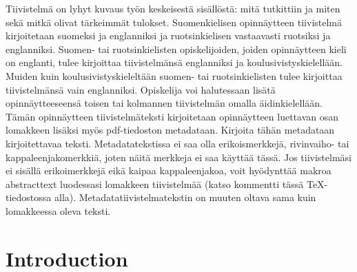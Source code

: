 \documentclass[english, 12pt, a4paper, sci, utf8, a-2b, online]{aaltothesis}
\theoremstyle{definition}
\theoremstyle{plain}
\numberwithin{equation}{section}
\begin{document}
\newpage
\date{9.2.2023}
\begin{abstractpage}[finnish]
Tiivistelmä on lyhyt kuvaus työn keskeisestä sisällöstä: mitä tutkittiin ja 
miten sekä mitkä olivat tärkeimmät tulokset. Suomenkielisen opinnäytteen 
tiivistelmä kirjoitetaan suomeksi ja englanniksi ja ruotsinkielisen vastaavasti 
ruotsiksi ja englanniksi. Suomen- tai ruotsinkielisten opiskelijoiden, joiden 
opinnäytteen kieli on englanti, tulee kirjoittaa tiivistelmänsä englanniksi ja 
koulusivistyskielellään. Muiden kuin koulusivistyskieleltään suomen- tai 
ruotsinkielisten tulee kirjoittaa tiivistelmänsä vain englanniksi. Opiskelija 
voi halutessaan lisätä opinnäytteeseensä toisen tai kolmannen tiivistelmän 
omalla äidinkielellään.
Tämän opinnäytteen tiivistelmäteksti kirjoitetaan opinnäytteen luettavan osan
lomakkeen lisäksi myös pdf-tiedoston metadataan. Kirjoita tähän metadataan
kirjoitettavaa teksti. Metadatatekstissa ei saa olla erikoismerkkejä,
rivinvaiho- tai kappaleenjakomerkkiä, joten näitä merkkeja ei saa käyttää tässä.
Jos tiivistelmäsi ei sisällä erikoimerkkejä eikä kaipaa kappaleenjakoa, voit
hyödynttää makroa abstracttext luodessasi lomakkeen tiivistelmää (katso
kommentti tässä TeX-tiedostossa alla). Metadatatiivistelmatekstin on muuten 
oltava sama kuin lomakkeessa oleva teksti.

\end{abstractpage}

\dothesispagenumbering{}

\newpage

\thesistableofcontents

\cleardoublepage

\section{Introduction}
\label{sec:intro}
\end{document}
